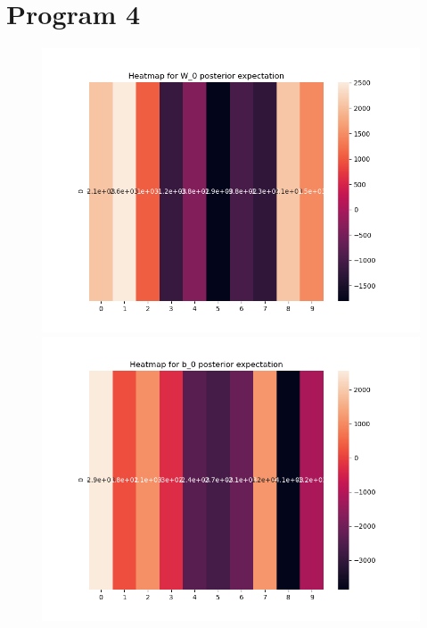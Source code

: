 \documentclass[10pt]{homeworg}
\begin{document}
\section{Program 4}
\begin{figure}[!htbp]
    \centering
    \begin{minipage}{0.45\textwidth}
        \centering
       \includegraphics[scale=0.5]{figures/heatmap_exp_W_0.png}
    \end{minipage}\hfill
    \begin{minipage}{0.45\textwidth}
        \centering
        \includegraphics[scale=0.5]{figures/heatmap_exp_b_0.png}
    \end{minipage}
\end{figure}
\end{document}

